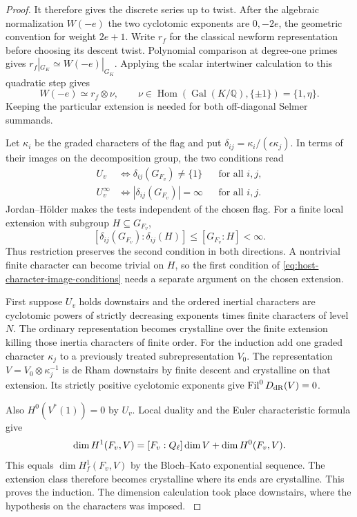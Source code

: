 \begin{proof}
It therefore gives the discrete series up to twist. After the algebraic normalization
\(W(-e)\) the two cyclotomic exponents are \(0,-2e\),
the geometric convention for weight \(2e+1\). Write \(r_f\) for the classical newform representation before
choosing its descent twist. Polynomial comparison at degree-one primes
gives \(r_f|_{G_K}\simeq W(-e)|_{G_K}\). Applying the scalar
intertwiner calculation to this quadratic step gives
\[
 W(-e)\simeq r_f\otimes\nu,\qquad
 \nu\in\operatorname{Hom}(\operatorname{Gal}(K/\mathbb Q),
                      \{\pm1\})=\{1,\eta\}.
\] Keeping the particular
extension is needed for both off-diagonal Selmer summands.

Let \(\kappa_i\) be the graded characters of the flag and put
\(\delta_{ij}=\kappa_i/(\epsilon\kappa_j)\). In terms of their
images on the decomposition group, the two conditions read
\begin{equation}\label{eq:host-character-image-conditions}
 \begin{aligned}
 U_v         &\iff \delta_{ij}(G_{F_v})\ne\{1\} &&\text{for all }i,j,\\
 U_v^\infty &\iff |\delta_{ij}(G_{F_v})|=\infty &&\text{for all }i,j .
 \end{aligned}
\end{equation}
Jordan--Hölder makes the tests independent of the chosen flag. For a
finite local extension with subgroup \(H\subseteq G_{F_v}\),
\[
 [\delta_{ij}(G_{F_v}):\delta_{ij}(H)]\le [G_{F_v}:H]<\infty .
\]
Thus restriction preserves the second condition in both directions.
A nontrivial finite character can become trivial on \(H\), so the
first condition of \eqref{eq:host-character-image-conditions}
needs a separate argument on the chosen extension.

First suppose \(U_v\) holds downstairs and the ordered
inertial characters are cyclotomic powers of strictly
decreasing exponents times finite characters of level
\(N\). The ordinary representation becomes crystalline
over the finite extension killing those inertia characters
of finite order. For the induction add one graded character
\(\kappa_j\) to a previously treated subrepresentation
\(V_0\). The representation
\(V=V_0\otimes\kappa_j^{-1}\) is de Rham downstairs by
finite descent and crystalline on that extension. Its
strictly positive cyclotomic exponents give
\(\operatorname{Fil}^0D_{\rm dR}(V)=0\).

Also \(H^0(V^*(1))=0\) by \(U_v\). Local duality and the Euler
characteristic formula give
\[
 \dim H^1(F_v,V)=[F_v:Q_\ell]\dim V+\dim H^0(F_v,V).
\]
This equals \(\dim H_f^1(F_v,V)\) by the Bloch--Kato
exponential sequence. The extension class therefore
becomes crystalline where its ends are crystalline.
This proves the induction. The dimension calculation took
place downstairs, where the hypothesis on the characters
was imposed. \hfill\mbox{\cite{bloch-kato-finite}}


\end{proof}
